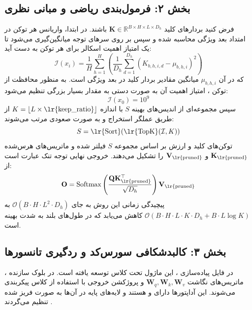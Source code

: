 \subsection*{بخش ۲: فرمول‌بندی ریاضی و مبانی نظری }
فرض کنید بردارهای کلید $\mathbf{K} \in \mathbb{R}^{B \times H \times L \times D_h}$ باشند. در ابتدا، واریانس هر توکن در امتداد بعد ویژگی  محاسبه شده و سپس بر روی سرهای توجه  میانگین‌گیری می‌شود تا یک امتیاز اهمیت اسکالر برای هر توکن به دست آید:
\begin{equation}
\mathcal{I}(x_i) = \frac{1}{H} \sum_{h=1}^{H} \left( \frac{1}{D_h} \sum_{d=1}^{D_h} \left( K_{b, h, i, d} - \mu_{b, h, i} \right)^2 \right)
\end{equation}
که در آن $\mu_{b, h, i}$ میانگین مقادیر بردار کلید در بعد ویژگی است. به منظور محافظت از توکن \lr{[CLS]}، امتیاز اهمیت آن به صورت دستی به مقدار بسیار بزرگی تنظیم می‌شود:
\begin{equation}
\mathcal{I}(x_0) = 10^9
\end{equation}
سپس مجموعه‌ای از اندیس‌های بهینه $S$ با اندازه $K = \lfloor L \times \text{\lr{keep\_ratio}} \rfloor$ از طریق عملگر  استخراج و به صورت صعودی مرتب می‌شوند:
\begin{equation}
S = \text{\lr{Sort}}(\text{\lr{TopK}}(\mathcal{I}, K))
\end{equation}
توکن‌های کلید و ارزش بر اساس مجموعه $S$ فیلتر شده و ماتریس‌های هرس‌شده $\mathbf{K}_{\text{\lr{pruned}}}$ و $\mathbf{V}_{\text{\lr{pruned}}}$ را تشکیل می‌دهند. خروجی نهایی توجه تنک عبارت است از:
\begin{equation}
\mathbf{O} = \operatorname{Softmax}\left( \frac{\mathbf{Q} \mathbf{K}_{\text{\lr{pruned}}}^\top}{\sqrt{D_h}} \right) \mathbf{V}_{\text{\lr{pruned}}}
\end{equation}
پیچیدگی زمانی این روش به جای $\mathcal{O}(B \cdot H \cdot L^2 \cdot D_h)$ به $\mathcal{O}(B \cdot H \cdot L \cdot K \cdot D_h + B \cdot L \log K)$ کاهش می‌یابد که در طول‌های بلند به شدت بهینه است.

\subsection*{بخش ۳: کالبدشکافی سورس‌کد و ردگیری تانسورها }
در فایل پیاده‌سازی ، این ماژول تحت کلاس  توسعه یافته است. در بلوک سازنده ، ماتریس‌های نگاشت $\mathbf{W}_q, \mathbf{W}_k, \mathbf{W}_v$ و پروژکشن خروجی با استفاده از کلاس  پیکربندی می‌شوند. این آداپتورها دارای  و  هستند و لایه‌های پایه در آن‌ها به صورت فریز شده تنظیم می‌گردند .

